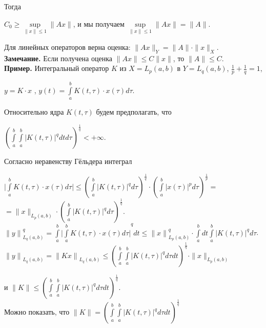 \documentclass[12pt,a4paper,titlepage, oneside]{book}
\theoremstyle{definition}
\theoremstyle{plain}
\theoremstyle{remark}
\theoremstyle{remark}
\theoremstyle{remark}
\theoremstyle{plain}
\theoremstyle{plain}
\begin{document}
Тогда 
\begin{center}
$ C_0 \geq\underset{\parallel x\parallel \leq 1}{\sup}\parallel Ax \parallel $, и мы получаем 
$\underset{\parallel x\parallel \leq 1}{\sup}\parallel Ax \parallel =\parallel A \parallel$.
\end{center}

Для линейных операторов верна оценка: $\parallel Ax \parallel _{Y} =\parallel A \parallel \cdot \parallel x \parallel_{X} $.\\

\textbf{Замечание.} Если получена оценка  $\parallel Ax \parallel \leq {C}  \parallel x \parallel$, то $\parallel A \parallel \leq {C} $.\\

\textbf{Пример.} Интегральный оператор $K$ из $X=L_p(a,b)$ в $Y=L_q(a,b)$, $
\frac{1}{p}+\frac{1}{q}=1$,
\begin{center}
$y=K\cdot x$ ,  $ y(t)=\int\limits_a^b K(t,\tau)\cdot x(\tau)d\tau$.
\end{center}

Относительно ядра $K(t,\tau)$ будем предполагать, что 
\begin{center}
${(\int\limits_a^b \int\limits_a^b {\vert K(t,\tau)\vert} ^q dtd\tau)^\frac{1}{q}} <+\infty$.
\end{center}

Согласно неравенству Гёльдера интеграл 
\begin{center}
$\vert \int\limits_a^b K(t,\tau)\cdot x(\tau)d\tau \vert \leq (\int\limits_a^b {\vert K(t,\tau)\vert} ^q d\tau)^\frac{1}{q} \cdot {(\int\limits_a^b {\vert x(\tau)\vert} ^p d\tau)}^\frac{1}{p}=$
\\ 
$= \parallel x \parallel _{L_p(a,b)}\cdot (\int\limits_a^b {\vert K(t,\tau)\vert} ^q d\tau)^\frac{1}{q}$.
\\ 
${\parallel y \parallel}^q _{L_q(a,b)}=\int\limits_a^b {\vert \int\limits_a^b K(t,\tau)\cdot x(\tau)d\tau \vert}^{q} dt\leq {\parallel x \parallel}^q _{L_p(a,b)} \cdot \int\limits_a^b dt \int\limits_a^b {\vert K(t,\tau)\vert} ^q d\tau$.
\\
${\parallel y \parallel}_{L_q(a,b)}=
{\parallel Kx\parallel}_{L_q(a,b)} \leq {(\int\limits_a^b \int\limits_a^b {\vert K(t,\tau)\vert} ^q d\tau dt)^\frac{1}{q}}\cdot \parallel x \parallel _{L_p(a,b)} $ 
\end{center}
и $\parallel K \parallel \leq {(\int\limits_a^b \int\limits_a^b {\vert K(t,\tau)\vert} ^q d\tau dt)^\frac{1}{q}}$.
\\
Можно показать, что $\parallel K \parallel = 
{(\int\limits_a^b \int\limits_a^b {\vert K(t,\tau)\vert} ^q d\tau dt)^\frac{1}{q}}$
\end{document}
